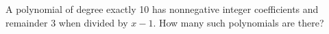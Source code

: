 A polynomial of degree exactly 10 has nonnegative integer coefficients and remainder 3 when divided by $x-1$. How many such polynomials are there?

